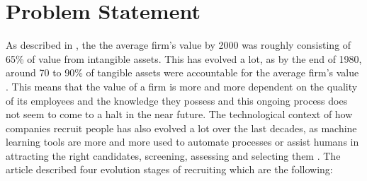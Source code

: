 \documentclass[draft,final]{thesisclass} %
\begin{document}
\section{Problem Statement} \label{problem_statement}
As described in \cite[1]{ai_recruiting}, the the average firm's value by 2000 was roughly consisting of 65\% of value from intangible assets.
This has evolved a lot, as by the end of 1980, around 70 to 90\% of tangible assets were accountable for the average firm's value \cite[1]{ai_recruiting}.
This means that the value of a firm is more and more dependent on the quality of its employees and the knowledge they possess and this ongoing process does not seem to come to a halt in the near future.
The technological context of how companies recruit people has also evolved a lot over the last decades, as machine learning tools are more and more used to automate processes or assist humans in attracting the right candidates, screening, assessing and selecting them \cite[2]{ai_recruiting}.
The article \cite[2-4]{ai_recruiting} described four evolution stages of recruiting which are the following:
\end{document}
